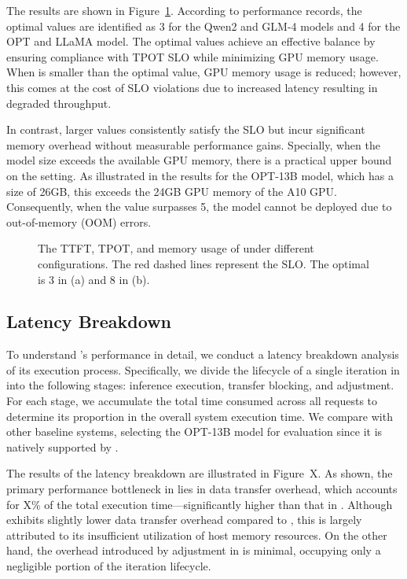 The results are shown in Figure~\ref{fig:profileraccu}. 
According to performance records, the optimal \interval values are identified as 3 for the Qwen2 and GLM-4 models and 4 for the OPT and LLaMA model. 
The optimal \interval values achieve an effective balance by ensuring compliance with TPOT SLO while minimizing GPU memory usage. 
When \interval is smaller than the optimal value, GPU memory usage is reduced; 
however, this comes at the cost of SLO violations due to increased latency resulting in degraded throughput. 

In contrast, larger \interval values consistently satisfy the SLO but incur significant memory overhead without measurable performance gains. 
Specially, when the model size exceeds the available GPU memory, there is a practical upper bound on the \interval setting. 
As illustrated in the results for the OPT-13B model, which has a size of 26GB, this exceeds the 24GB GPU memory of the A10 GPU. 
Consequently, when the \interval value surpasses 5, the model cannot be deployed due to out-of-memory (OOM) errors.

\begin{figure}[t]
    \centering
    \resizebox{\columnwidth}{!}{
 }
    \caption{The TTFT, TPOT, and memory usage of \sys under different \interval configurations. 
 The red dashed lines represent the SLO. The optimal \interval is 3 in (a) and 8 in (b).}
    \label{fig:profileraccu}
\end{figure}

\subsection{Latency Breakdown}

To understand \sys's performance in detail, we conduct a latency breakdown analysis of its execution process. 
Specifically, we divide the lifecycle of a single iteration in \sys into the following stages: inference execution, transfer blocking, and \interval adjustment. 
For each stage, we accumulate the total time consumed across all requests to determine its proportion in the overall system execution time. 
We compare \sys with other baseline systems, selecting the OPT-13B model for evaluation since it is natively supported by \flexgen. 

The results of the latency breakdown are illustrated in Figure~X. 
As shown, the primary performance bottleneck in \deepspeed lies in data transfer overhead, which accounts for X\% of the total execution time—significantly 
higher than that in \sys. Although \flexgen exhibits slightly lower data transfer overhead compared to \sys, 
this is largely attributed to its insufficient utilization of host memory resources. 
On the other hand, the overhead introduced by \interval adjustment in \sys is minimal, occupying only a negligible portion of the iteration lifecycle. 

